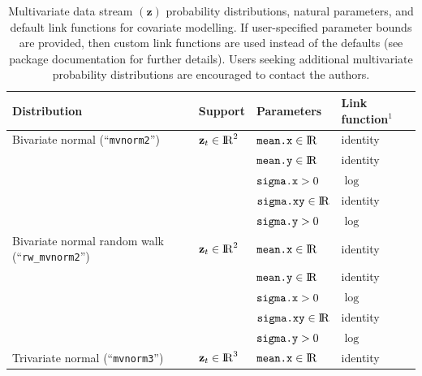 \documentclass[12pt]{article}\usepackage[]{graphicx}\usepackage[]{xcolor}
\begin{document}
\begin{small}
\begin{table}
  \caption{\label{tab:multipdfs} Multivariate data stream $({\mathbf z})$ probability distributions, natural parameters, and default link functions for covariate modelling. If user-specified parameter bounds are provided, then custom link functions are used instead of the defaults (see package documentation for further details). Users seeking additional multivariate probability distributions are encouraged to contact the authors.}
  \begin{tabular}{llll}
  \toprule
  Distribution                                          & Support                         & Parameters                       & Link function$^1$ \tabularnewline
  \midrule
  \rowcolor{Gray} Bivariate normal (``\verb|mvnorm2|'') & ${\mathbf z_t}\in{\rm I\!R}^2$  & $\verb|mean.x|\in{\rm I\!R}$     &  identity \tabularnewline  
  \rowcolor{Gray}                                       &                                 & $\verb|mean.y|\in{\rm I\!R}$     &  identity \tabularnewline  
  \rowcolor{Gray}                                       &                                 & $\verb|sigma.x|>0$               &  $\log$ \tabularnewline                                                
  \rowcolor{Gray}                                       &                                 & $\verb|sigma.xy|\in{\rm I\!R}$   &  identity \tabularnewline                                              
  \rowcolor{Gray}                                       &                                 & $\verb|sigma.y|>0$               &  $\log$ \tabularnewline  
  Bivariate normal random walk (``\verb|rw_mvnorm2|'')  & ${\mathbf z_t}\in{\rm I\!R}^2$  & $\verb|mean.x|\in{\rm I\!R}$     &  identity \tabularnewline  
                                                        &                                 & $\verb|mean.y|\in{\rm I\!R}$     &  identity \tabularnewline  
                                                        &                                 & $\verb|sigma.x|>0$               &  $\log$ \tabularnewline                                                                                                                      &                                 & $\verb|sigma.xy|\in{\rm I\!R}$   &  identity \tabularnewline                                                                                                                    &                                 & $\verb|sigma.y|>0$               &  $\log$ \tabularnewline
  \rowcolor{Gray} Trivariate normal (``\verb|mvnorm3|'')& ${\mathbf z_t}\in{\rm I\!R}^3$  & $\verb|mean.x|\in{\rm I\!R}$     &  identity \tabularnewline  

\end{tabular}
\end{table}
\end{small}
\end{document}
